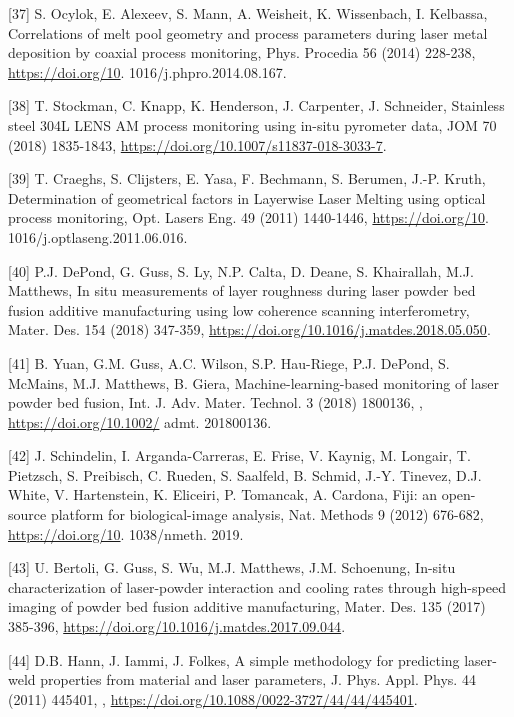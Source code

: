 \documentclass[10pt]{article}
\begin{document}
[37] S. Ocylok, E. Alexeev, S. Mann, A. Weisheit, K. Wissenbach, I. Kelbassa, Correlations of melt pool geometry and process parameters during laser metal deposition by coaxial process monitoring, Phys. Procedia 56 (2014) 228-238, \href{https://doi.org/10}{https://doi.org/10}. 1016/j.phpro.2014.08.167.

[38] T. Stockman, C. Knapp, K. Henderson, J. Carpenter, J. Schneider, Stainless steel 304L LENS AM process monitoring using in-situ pyrometer data, JOM 70 (2018) 1835-1843, \href{https://doi.org/10.1007/s11837-018-3033-7}{https://doi.org/10.1007/s11837-018-3033-7}.

[39] T. Craeghs, S. Clijsters, E. Yasa, F. Bechmann, S. Berumen, J.-P. Kruth, Determination of geometrical factors in Layerwise Laser Melting using optical process monitoring, Opt. Lasers Eng. 49 (2011) 1440-1446, \href{https://doi.org/10}{https://doi.org/10}. 1016/j.optlaseng.2011.06.016.

[40] P.J. DePond, G. Guss, S. Ly, N.P. Calta, D. Deane, S. Khairallah, M.J. Matthews, In situ measurements of layer roughness during laser powder bed fusion additive manufacturing using low coherence scanning interferometry, Mater. Des. 154 (2018) 347-359, \href{https://doi.org/10.1016/j.matdes.2018.05.050}{https://doi.org/10.1016/j.matdes.2018.05.050}.

[41] B. Yuan, G.M. Guss, A.C. Wilson, S.P. Hau-Riege, P.J. DePond, S. McMains, M.J. Matthews, B. Giera, Machine-learning-based monitoring of laser powder bed fusion, Int. J. Adv. Mater. Technol. 3 (2018) 1800136, , \href{https://doi.org/10.1002/}{https://doi.org/10.1002/} admt. 201800136.

[42] J. Schindelin, I. Arganda-Carreras, E. Frise, V. Kaynig, M. Longair, T. Pietzsch, S. Preibisch, C. Rueden, S. Saalfeld, B. Schmid, J.-Y. Tinevez, D.J. White, V. Hartenstein, K. Eliceiri, P. Tomancak, A. Cardona, Fiji: an open-source platform for biological-image analysis, Nat. Methods 9 (2012) 676-682, \href{https://doi.org/10}{https://doi.org/10}. 1038/nmeth. 2019.

[43] U. Bertoli, G. Guss, S. Wu, M.J. Matthews, J.M. Schoenung, In-situ characterization of laser-powder interaction and cooling rates through high-speed imaging of powder bed fusion additive manufacturing, Mater. Des. 135 (2017) 385-396, \href{https://doi.org/10.1016/j.matdes.2017.09.044}{https://doi.org/10.1016/j.matdes.2017.09.044}.

[44] D.B. Hann, J. Iammi, J. Folkes, A simple methodology for predicting laser-weld properties from material and laser parameters, J. Phys. Appl. Phys. 44 (2011) 445401, , \href{https://doi.org/10.1088/0022-3727/44/44/445401}{https://doi.org/10.1088/0022-3727/44/44/445401}.
\end{document}
